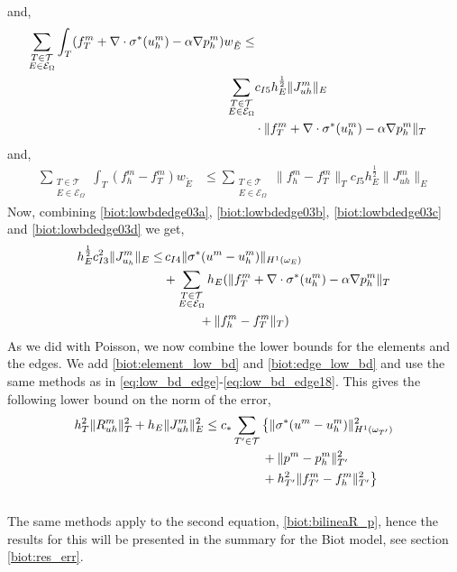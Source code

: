 and, 
\begin{align} \label{biot:lowbdedge03c}
\sum_{\substack{T \in \mathcal{T} \\E \in \mathcal{E}_\Omega}} \int_T (f^m_T + \nabla \cdot \sigma^{\ast}(u^m_h) - \alpha \nabla p^m_h) w_{\tilde{E}} \leq \\ \sum_{\substack{T \in \mathcal{T} \\ E \in \mathcal{E}_\Omega}} & c_{I5}h_E^{\frac{1}{2}} \|J^m_{uh}\|_E \\
& \cdot \|f^m_T + \nabla \cdot \sigma^{\ast}(u^m_h) - \alpha \nabla p^m_h\|_T  \notag
\end{align}
and,
\begin{align} \label{biot:lowbdedge03d}
\sum_{\substack{T \in \mathcal{T} \\ E \in \mathcal{E}_\Omega}} \int_T (f^m_h-f^m_T)w_{\tilde{E}} & \leq \sum_{\substack{T \in \mathcal{T} \\ E \in \mathcal{E}_\Omega}} \|f^m_h-f^m_T\|_T c_{I5} h_E^{\frac{1}{2}} \|J^m_{uh}\|_E
\end{align}
Now, combining \eqref{biot:lowbdedge03a}, \eqref{biot:lowbdedge03b}, \eqref{biot:lowbdedge03c} and \eqref{biot:lowbdedge03d} we get,
\begin{align} \label{biot:edge_low_bd}
h_E^{\frac{1}{2}} c_{I3}^2 \|J^m_{u_h}\|_E \leq & \, c_{I4} \| \sigma^{\ast}(u^m-u^m_h) \|_{H^1(\omega_E)} \\
& +  \sum_{\substack{T \in \mathcal{T} \\ E \in \mathcal{E}_\Omega}} h_E (\|f^m_T + \nabla \cdot \sigma^{\ast}(u^m_h) - \alpha \nabla p^m_h\|_T \notag \\
& \hspace{1cm} + \|f^m_h-f^m_T\|_T) \notag
\end{align}
As we did with Poisson, we now combine the lower bounds for the elements and the edges. We add  \eqref{biot:element_low_bd} and \eqref{biot:edge_low_bd} and use the same methods as in \eqref{eq:low_bd_edge}-\eqref{eq:low_bd_edge18}. This gives the following lower bound on the norm of the error, 
\begin{align}
h_T^2 \| R_{uh}^m\|_T^2 + h_E\| J_{uh}^m\|_E^2 \leq c_* \sum_{T' \in \mathcal{T}} & \, \bigl\{ \| \sigma^{\ast}(u^m-u^m_h) \|^2_{H^1(\omega_{T'})} \\
& \, + \| p^m-p_h^m\|^2_{T'} \notag \\
& \, + h^2_{T'}\| f^m_{T'}-f^m_h\|^2_{T'}\bigr\} \notag
\end{align}
\\
The same methods apply to the second equation, \eqref{biot:bilineaR_p}, hence the results for this will be presented in the summary for the Biot model, see section \ref{biot:res_err}. 

